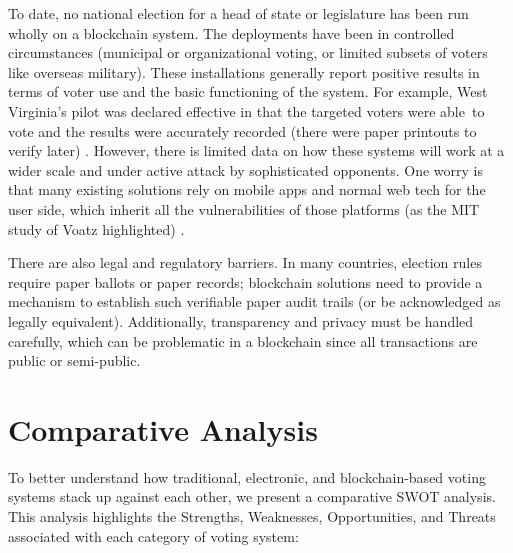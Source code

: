 \documentclass[a4paper,10pt]{report}
\begin{document}
 To date, no national election for a head of state or legislature has been run wholly on a blockchain system.  The deployments have been in controlled circumstances (municipal or organizational voting, or limited subsets of voters like overseas military).  These installations generally report positive results in terms of voter use and the basic functioning of the system.  For example, West Virginia’s pilot was declared effective in that the targeted voters were able to vote and the results were accurately recorded (there were paper printouts to verify later) \cite{voatz2018pilot}.  However, there is limited data on how these systems will work at a wider scale and under active attack by sophisticated opponents.  One worry is that many existing solutions rely on mobile apps and normal web tech for the user side, which inherit all the vulnerabilities of those platforms (as the MIT study of Voatz highlighted) \cite{mit2020voatz}.

 There are also legal and regulatory barriers.  In many countries, election rules require paper ballots or paper records; blockchain solutions need to provide a mechanism to establish such verifiable paper audit trails (or be acknowledged as legally equivalent).  Additionally, transparency and privacy must be handled carefully, which can be problematic in a blockchain since all transactions are public or semi-public.

\section{Comparative Analysis}

To better understand how traditional, electronic, and blockchain-based voting systems stack up against each other, we present a comparative SWOT analysis. This analysis highlights the Strengths, Weaknesses, Opportunities, and Threats associated with each category of voting system:
\end{document}
